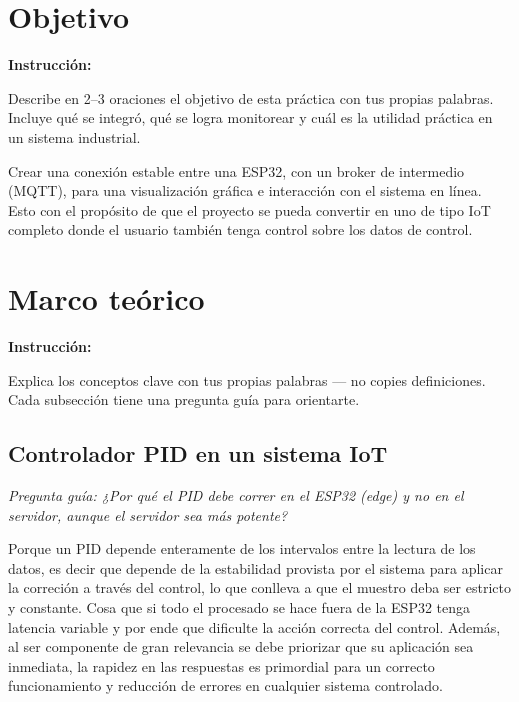 \documentclass[11pt, letterpaper]{article}
\newenvironment{instruccion}{%
  \begin{mdframed}[backgroundcolor=tealLight,linecolor=tealMain,linewidth=1pt,
    innerleftmargin=10pt,innerrightmargin=10pt,
    innertopmargin=6pt,innerbottommargin=6pt]
  \small\textbf{\color{tealMain}Instrucci\'on:}\hspace{4pt}
}{\end{mdframed}}
\begin{document}
\newpage
\tableofcontents
\newpage

\section{Objetivo}

\begin{instruccion}
  Describe en 2--3 oraciones el objetivo de esta pr\'actica con
  tus propias palabras. Incluye qu\'e se integr\'o, qu\'e se logra
  monitorear y cu\'al es la utilidad pr\'actica en un sistema industrial.
\end{instruccion}

Crear una conexi\'on estable entre una ESP32, con un broker de intermedio (MQTT), para una visualizaci\'on gr\'afica e interacci\'on con el sistema en l\'inea. Esto con el prop\'osito de que el proyecto se pueda convertir en uno de tipo IoT completo donde el usuario tambi\'en tenga control sobre los datos de control.

\vspace{0.4cm}
\section{Marco teórico}

\begin{instruccion}
  Explica los conceptos clave con tus propias palabras --- no copies
  definiciones. Cada subsección tiene una pregunta gu\'ia para orientarte.
\end{instruccion}

\subsection{Controlador PID en un sistema IoT}

\textit{Pregunta gu\'ia: ¿Por qu\'e el PID debe correr en el ESP32
(edge) y no en el servidor, aunque el servidor sea m\'as potente?}

Porque un PID depende enteramente de los intervalos entre la lectura de los datos, es decir que depende de la estabilidad provista por el sistema para aplicar la correci\'on a trav\'es del control, lo que conlleva a que el muestro deba ser estricto y constante. Cosa que si todo el procesado se hace fuera de la ESP32 tenga latencia variable y por ende que dificulte la acción correcta del control. Adem\'as, al ser componente de gran relevancia se debe priorizar que su aplicaci\'on sea inmediata, la rapidez en las respuestas es primordial para un correcto funcionamiento y reducción de errores en cualquier sistema controlado.
\end{document}
